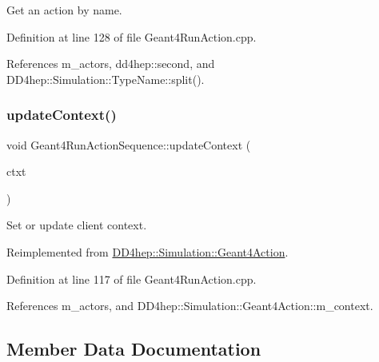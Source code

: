 Get an action by name. 



Definition at line 128 of file Geant4\+Run\+Action.\+cpp.



References m\+\_\+actors, dd4hep\+::second, and D\+D4hep\+::\+Simulation\+::\+Type\+Name\+::split().

\hypertarget{class_d_d4hep_1_1_simulation_1_1_geant4_run_action_sequence_ad94eee6a819a88302a0eaa0874d88fa3}{}\label{class_d_d4hep_1_1_simulation_1_1_geant4_run_action_sequence_ad94eee6a819a88302a0eaa0874d88fa3} 
\subsubsection{\texorpdfstring{update\+Context()}{updateContext()}}
{\footnotesize\ttfamily void Geant4\+Run\+Action\+Sequence\+::update\+Context (\begin{DoxyParamCaption}\item[{\hyperlink{class_d_d4hep_1_1_simulation_1_1_geant4_context}{Geant4\+Context} $\ast$}]{ctxt }\end{DoxyParamCaption})\hspace{0.3cm}{\ttfamily [virtual]}}



Set or update client context. 



Reimplemented from \hyperlink{class_d_d4hep_1_1_simulation_1_1_geant4_action_ae3b9daf2af881df956c46568c0743313}{D\+D4hep\+::\+Simulation\+::\+Geant4\+Action}.



Definition at line 117 of file Geant4\+Run\+Action.\+cpp.



References m\+\_\+actors, and D\+D4hep\+::\+Simulation\+::\+Geant4\+Action\+::m\+\_\+context.



\subsection{Member Data Documentation}
\hypertarget{class_d_d4hep_1_1_simulation_1_1_geant4_run_action_sequence_a780b499622542d52941141b108ab1258}{}\label{class_d_d4hep_1_1_simulation_1_1_geant4_run_action_sequence_a780b499622542d52941141b108ab1258} 
